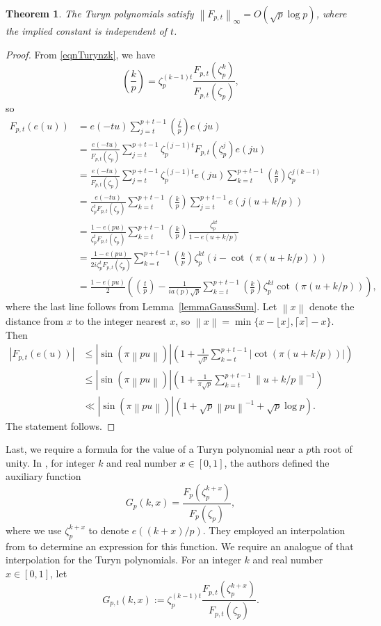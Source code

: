\documentclass[reqno]{amsart}
\newtheorem{theorem}{Theorem}[section]
\numberwithin{equation}{section}
\numberwithin{table}{section}
\numberwithin{figure}{section}
\newcommand{\ceil}[1]{\lceil#1\rceil}
\newcommand{\floor}[1]{\lfloor#1\rfloor}
\newcommand{\leg}[2]{\left(\frac{#1}{#2}\right)}
\newcommand{\abs}[1]{\left\lvert#1\right\rvert}
\newcommand{\dbars}[1]{\left\lVert#1\right\rVert}
\begin{document}
\begin{theorem}\label{thmMontgomery}
The Turyn polynomials satisfy $\dbars{F_{p,t}}_\infty = O\left(\sqrt{p} \log p\right)$, where the implied constant is independent of $t$.
\end{theorem}

\begin{proof}
From \eqref{eqnTurynzk}, we have
\[
\leg{k}{p} = \zeta_p^{(k-1)t}\frac{F_{p,t}(\zeta_p^k)}{F_{p,t}(\zeta_p)},
\]
so
\begin{align*}
F_{p,t}(e(u))
&= e(-tu) \sum_{j=t}^{p+t-1} \leg{j}{p} e(ju)\\
&= \frac{e(-tu)}{F_{p,t}(\zeta_p)} \sum_{j=t}^{p+t-1} \zeta_p^{(j-1)t} F_{p,t}(\zeta_p^j) e(ju)\\
&= \frac{e(-tu)}{F_{p,t}(\zeta_p)} \sum_{j=t}^{p+t-1} \zeta_p^{(j-1)t} e(ju) \sum_{k=t}^{p+t-1} \leg{k}{p} \zeta_p^{j(k-t)} \\
&= \frac{e(-tu)}{\zeta_p^t F_{p,t}(\zeta_p)} \sum_{k=t}^{p+t-1} \leg{k}{p} \sum_{j=t}^{p+t-1}  e\left(j(u+k/p)\right)\\
&= \frac{1-e(pu)}{\zeta_p^t F_{p,t}(\zeta_p)}  \sum_{k=t}^{p+t-1} \leg{k}{p} \frac{\zeta_p^{kt}}{1-e(u+k/p)}\\
&= \frac{1-e(pu)}{2i\zeta_p^t F_{p,t}(\zeta_p)}\sum_{k=t}^{p+t-1} \leg{k}{p}\zeta_p^{kt}\left(i-\cot(\pi(u+k/p)) \right)\\
&= \frac{1-e(pu)}{2}\left(\leg{t}{p} - \frac{1}{i a(p)\sqrt{p}}\sum_{k=t}^{p+t-1}\leg{k}{p}\zeta_p^{kt}\cot(\pi(u+k/p))\right),
\end{align*}
where the last line follows from Lemma~\ref{lemmaGaussSum}.
Let $\dbars{x}$ denote the distance from $x$ to the integer nearest $x$, so $\dbars{x}=\min\{x-\floor{x},\ceil{x}-x\}$.
Then
\begin{align*}
\abs{F_{p,t}(e(u))}
&\leq \abs{\sin(\pi \dbars{p u})} \left(1 + \frac{1}{\sqrt{p}}\sum_{k=t}^{p+t-1} \abs{\cot(\pi(u+k/p))}\right)\\
&\leq \abs{\sin(\pi \dbars{p u})} \left(1 + \frac{1}{\pi\sqrt{p}} \sum_{k=t}^{p+t-1} \dbars{u + k/p}^{-1}\right)\\
&\ll \abs{\sin(\pi \dbars{p u})}\left(1 + \sqrt{p}\dbars{pu}^{-1} + \sqrt{p}\log p\right).
\end{align*}
The statement follows.
\end{proof}

Last, we require a formula for the value of a Turyn polynomial near a $p$th root of unity.
In \cite{KLM23}, for integer $k$ and real number $x\in[0,1]$, the authors defined the auxiliary function
\[
G_p(k,x) = \frac{F_p(\zeta_p^{k+x})}{F_p(\zeta_p)},
\]
where we use $\zeta_p^{k+x}$ to denote $e((k+x)/p)$.
They employed an interpolation from \cite{CGPS00} to determine an expression for this function.
We require an analogue of that interpolation for the Turyn polynomials.
For an integer $k$ and real number $x\in[0,1]$, let
\begin{equation}\label{eqnGpt}
G_{p,t}(k,x) := \zeta_p^{(k-1)t} \frac{F_{p,t}(\zeta_p^{k+x})}{F_{p,t}(\zeta_p)}.
\end{equation}
\end{document}
